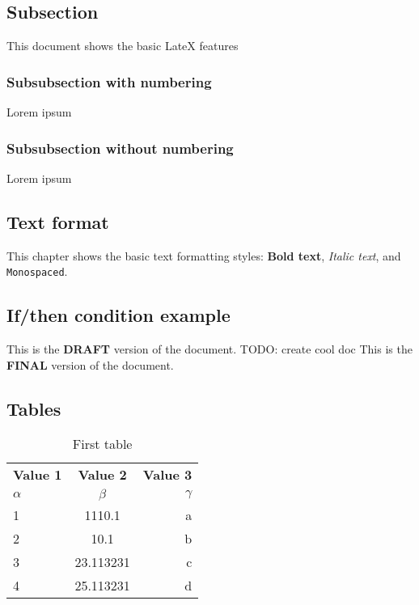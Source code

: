 \subsection{Subsection}
This document shows the basic LateX features

\subsubsection{Subsubsection with numbering}
Lorem ipsum

\subsubsection*{Subsubsection without numbering}
Lorem ipsum

\subsection{Text format}
This chapter shows the basic text formatting styles: \textbf{Bold text}, \textit{Italic text}, and \texttt{Monospaced}.

\subsection{If/then condition example}
{This is the \textbf{DRAFT} version of the document. TODO: create cool doc}
{This is the \textbf{FINAL} version of the document.}

\subsection{Tables}
\begin{table}[H]
    \begin{center}
    \begin{tabular}{l|c|r}
        \textbf{Value 1} & \textbf{Value 2} & \textbf{Value 3}\\
        $\alpha$ & $\beta$ & $\gamma$ \\
        \hline
        1 & 1110.1 & a\\
        2 & 10.1 & b\\
        3 & 23.113231 & c\\
        4 & 25.113231 & d\\ %
    \end{tabular}
    \caption{First table}
    \end{center}
\end{table}

